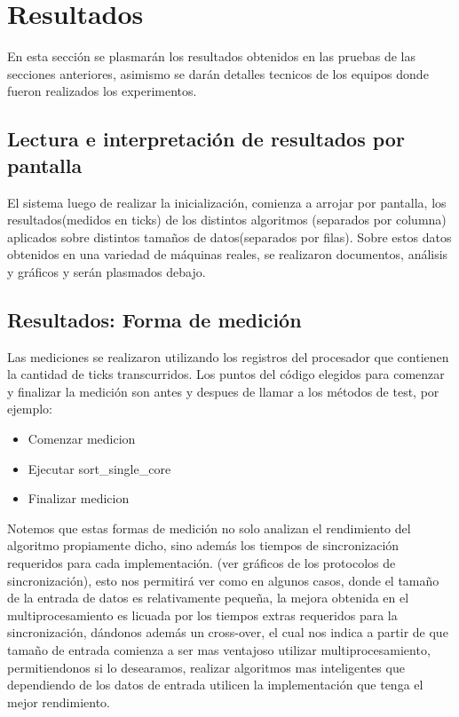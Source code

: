 \section{Resultados}
En esta sección se plasmarán los resultados obtenidos en las pruebas de las secciones anteriores, asimismo se darán detalles tecnicos de los equipos donde fueron realizados los experimentos.
\subsection{Lectura e interpretación de resultados por pantalla}
El sistema luego de realizar la inicialización, comienza a arrojar por pantalla, los resultados(medidos en ticks) de los distintos algoritmos (separados por columna) aplicados sobre distintos tamaños de datos(separados por filas). Sobre estos datos obtenidos en una variedad de máquinas reales, se realizaron documentos, análisis y gráficos y serán plasmados debajo.
\subsection{Resultados: Forma de medición}
Las mediciones se realizaron utilizando los registros del procesador que contienen la cantidad de ticks transcurridos. Los puntos del código elegidos para comenzar y finalizar la medición son antes y despues de llamar a los métodos de test, por ejemplo:
\begin{itemize}
	\item Comenzar medicion
	\item Ejecutar sort\_single\_core\(\)
	\item Finalizar medicion
\end{itemize}

Notemos que estas formas de medición no solo analizan el rendimiento del algoritmo propiamente dicho, sino además los tiempos de sincronización requeridos para cada implementación. (ver gráficos de los protocolos de sincronización), esto nos permitirá ver como en algunos casos, donde el tamaño de la entrada de datos es relativamente pequeña, la mejora obtenida en el multiprocesamiento es licuada por los tiempos extras requeridos para la sincronización, dándonos además un cross-over, el cual nos indica a partir de que tamaño de entrada comienza a ser mas ventajoso utilizar multiprocesamiento, permitiendonos si lo desearamos, realizar algoritmos mas inteligentes que dependiendo de los datos de entrada utilicen la implementación que tenga el mejor rendimiento.


